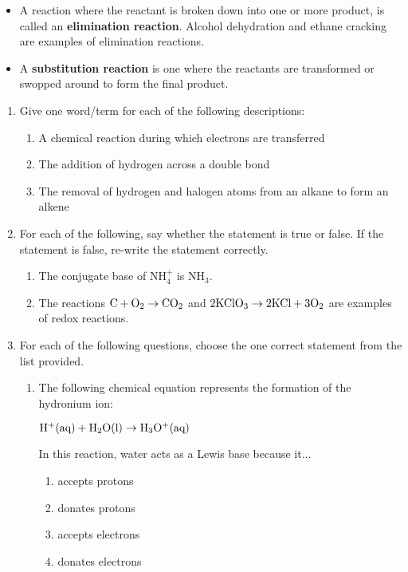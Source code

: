 \begin{itemize}
\item{A reaction where the reactant is broken down into one or more product, is called an \textbf{elimination reaction}. Alcohol dehydration and ethane cracking are examples of elimination reactions.}
\item{A \textbf{substitution reaction} is one where the reactants are transformed or swopped around to form the final product.}
\end{itemize}

\begin{eocexercises}{}
\begin{enumerate}
\item{
Give one word/term for each of the following descriptions:
\begin{enumerate}
\item{A chemical reaction during which electrons are transferred}
\item{The addition of hydrogen across a double bond}
\item{The removal of hydrogen and halogen atoms from an alkane to form an alkene}
\end{enumerate}
}

\item{
For each of the following, say whether the statement is true or false. If the statement is false, re-write the statement correctly.
\begin{enumerate}
\item{The conjugate base of NH$_{4}^{+}$ is NH$_{3}$.}
\item{The reactions $\rm{C + O_{2} \rightarrow CO_{2}}$ and $\rm{2KClO_{3} \rightarrow 2KCl + 3O_{2}}$ are examples of redox reactions.}
\end{enumerate}
}

\item{For each of the following questions, choose the one correct statement from the list provided.}
\renewcommand{\labelenumii}{\Alph{enumii}}

\begin{enumerate}
\item{
The following chemical equation represents the formation of the hydronium ion:
\begin{center}
$\rm{H^{+} (aq) + H_{2}O (l) \rightarrow H_{3}O^{+} (aq)}$
\end{center}

In this reaction, water acts as a Lewis base because it...
\begin{enumerate}
\item{accepts protons}
\item{donates protons}
\item{accepts electrons}
\item{donates electrons}
\end{enumerate}
}


\end{enumerate}
\end{enumerate}
\end{eocexercises}
